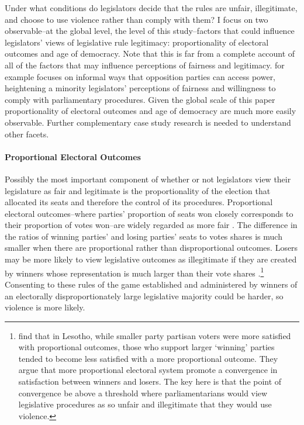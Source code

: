 \documentclass[a4paper]{article}\usepackage{graphicx, color}
\begin{document}
Under what conditions do legislators decide that the rules are unfair, illegitimate, and choose to use violence rather than comply with them? I focus on two observable--at the global level, the level of this study--factors that could influence legislators' views of legislative rule legitimacy: proportionality of electoral outcomes and age of democracy. Note that this is far from a complete account of all of the factors that may influence perceptions of fairness and legitimacy. \cite{Wolfe2004} for example focuses on informal ways that opposition parties can access power, heightening a minority legislators' perceptions of fairness and willingness to comply with parliamentary procedures. Given the global scale of this paper proportionality of electoral outcomes and age of democracy are much more easily observable. Further complementary case study research is needed to understand other facets.

\paragraph{Proportional Electoral Outcomes}

Possibly the most important component of whether or not legislators view their legislature as fair and legitimate is the proportionality of the election that allocated its seats and therefore the control of its procedures. Proportional electoral outcomes--where parties' proportion of seats won closely corresponds to their proportion of votes won--are widely regarded as more fair \citep{norris1997}. The difference in the ratios of winning parties' and losing parties' seats to votes shares is much smaller when there are proportional rather than disproportional outcomes. Losers may be more likely to view legislative outcomes as illegitimate if they are created by winners whose representation is much larger than their vote shares \citep[see][]{lijphart1999}.\footnote{\cite{CHO2006} find that in Lesotho, while smaller party partisan voters were more satisfied with proportional outcomes, those who support larger `winning' parties tended to become less satisfied with a more proportional outcome. They argue that more proportional electoral system promote a convergence in satisfaction between winners and losers. The key here is that the point of convergence be above a threshold where parliamentarians would view legislative procedures as so unfair and illegitimate that they would use violence.} Consenting to these rules of the game established and administered by winners of an electorally disproportionately large legislative majority could be harder, so violence is more likely.
\end{document}
